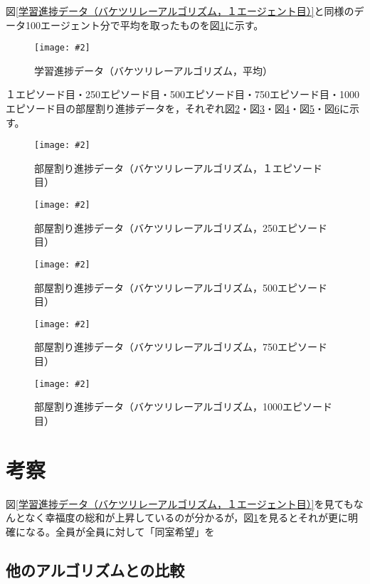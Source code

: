 \documentclass[titlepage]{ltjsreport}
\newcommand{\image}[2]{\begin{figure}[h]\vspace{1em}\begin{center}\texttt{[image: \#2]}\caption{#1}\label{#1}\end{center}\end{figure}}
\begin{document}
図\ref{学習進捗データ（バケツリレーアルゴリズム，１エージェント目）}と同様のデータ100エージェント分で平均を取ったものを図\ref{学習進捗データ（バケツリレーアルゴリズム，平均）}に示す。
\image{学習進捗データ（バケツリレーアルゴリズム，平均）}{外部ファイル/学習進捗データ/バケツリレーアルゴリズム/平均.png}

１エピソード目・250エピソード目・500エピソード目・750エピソード目・1000エピソード目の部屋割り進捗データを，それぞれ図\ref{部屋割り進捗データ（バケツリレーアルゴリズム，１エピソード目）}・図\ref{部屋割り進捗データ（バケツリレーアルゴリズム，250エピソード目）}・図\ref{部屋割り進捗データ（バケツリレーアルゴリズム，500エピソード目）}・図\ref{部屋割り進捗データ（バケツリレーアルゴリズム，750エピソード目）}・図\ref{部屋割り進捗データ（バケツリレーアルゴリズム，1000エピソード目）}に示す。
\image{部屋割り進捗データ（バケツリレーアルゴリズム，１エピソード目）}{外部ファイル/部屋割り進捗データ/バケツリレーアルゴリズム/１エピソード目}
\image{部屋割り進捗データ（バケツリレーアルゴリズム，250エピソード目）}{外部ファイル/部屋割り進捗データ/バケツリレーアルゴリズム/250エピソード目}
\image{部屋割り進捗データ（バケツリレーアルゴリズム，500エピソード目）}{外部ファイル/部屋割り進捗データ/バケツリレーアルゴリズム/500エピソード目}
\image{部屋割り進捗データ（バケツリレーアルゴリズム，750エピソード目）}{外部ファイル/部屋割り進捗データ/バケツリレーアルゴリズム/750エピソード目}
\image{部屋割り進捗データ（バケツリレーアルゴリズム，1000エピソード目）}{外部ファイル/部屋割り進捗データ/バケツリレーアルゴリズム/1000エピソード目}
\chapter{考察}
図\ref{学習進捗データ（バケツリレーアルゴリズム，１エージェント目）}を見てもなんとなく幸福度の総和が上昇しているのが分かるが，図\ref{学習進捗データ（バケツリレーアルゴリズム，平均）}を見るとそれが更に明確になる。全員が全員に対して「同室希望」を
\section{他のアルゴリズムとの比較}
\end{document}
